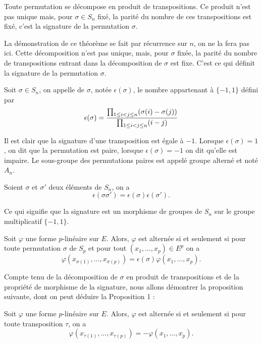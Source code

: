 \documentclass[class=report,crop=false]{standalone}
\begin{document}
\begin{theoreme}
Toute permutation se décompose en produit de transpositions. Ce produit n'est pas
unique mais, pour $\sigma\in S_n$ fixé, la parité du nombre de ces transpositions est fixé, c'est
la signature de la permutation $\sigma$.  
\end{theoreme}

La démonstration de ce théorème se fait par récurrence sur $n$, on ne la fera pas ici. 
Cette décomposition n'est pas unique, mais, pour $\sigma$ fixée, la parité du nombre de transpositions entrant dans la décomposition de $\sigma$ est fixe.
C'est ce qui définit la signature de la permutation $\sigma$.

\begin{definition}
Soit $\sigma\in S_n$, on appelle  de $\sigma$, notée $\epsilon(\sigma)$,
le nombre appartenant à $\{-1,1\}$ défini par
$$\epsilon(\sigma)={{\prod_{1\leq i<j\leq n}^{} (\sigma(i)-\sigma(j)) }\over{\prod_{1\leq i<j\leq n}^{}(i-j)}}$$
\end{definition}

Il est clair que la signature d'une transposition est égale à $-1$.
Lorsque $\epsilon(\sigma)=1$, on dit que la permutation est paire, lorsque $\epsilon(\sigma)=-1$ on dit qu'elle est impaire.
Le sous-groupe des permutations paires est appelé groupe alterné et noté $A_n$.


\begin{proposition}
Soient $\sigma$ et $\sigma'$ deux éléments de $S_n$, on a 
$$\epsilon(\sigma\sigma')=\epsilon(\sigma)\epsilon(\sigma').$$
\end{proposition} 

Ce qui signifie que la signature est un morphisme de groupes de $S_n$ 
sur le groupe multiplicatif $\{-1,1\}$.

\begin{proposition}
Soit $\varphi$ une forme $p$-linéaire sur $E$. Alors, $\varphi$ est alternée si et
seulement si pour toute permutation $\sigma$ de $S_p$ et pour tout $(x_1,\dots,x_p)\in E^p$ on a 
$$\varphi(x_{\sigma(1)},\dots,x_{\sigma(p)})=\epsilon(\sigma)\varphi(x_1,\dots,x_p).$$  
\end{proposition}


Compte tenu de la décomposition de $\sigma$ en produit de transpositions 
et de la propriété de morphisme de la signature, nous allons démontrer 
la proposition suivante, dont on peut déduire la Proposition 1 :
\begin{proposition}
Soit $\varphi$ une forme $p$-linéaire sur $E$. Alors, $\varphi$ est alternée si et
seulement si pour toute transposition $\tau$, on a
$$\varphi(x_{\tau(1)},\dots,x_{\tau(p)})=-\varphi(x_1,\dots,x_p).$$  
\end{proposition}
\end{document}

